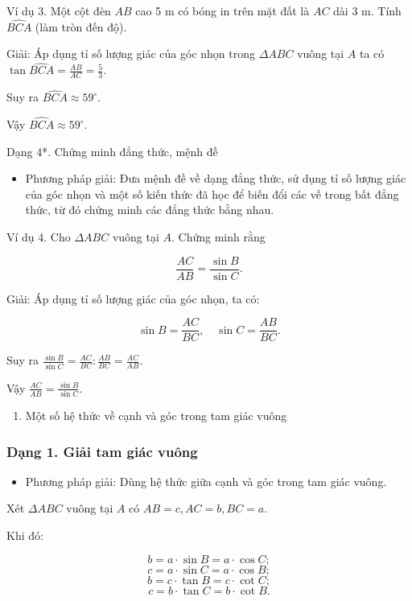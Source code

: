 \documentclass[%
    fontsize=12pt,%
    chapterprefix=false,%
    open=right,%
    twoside=false,%
    numbers=noenddot,%
    headings=optiontohead,%
    final,%
    DIV=15,%
    parskip=half %
]{scrbook}
\begin{document}

Ví dụ 3. Một cột đèn $ AB $ cao 5 m có bóng in trên mặt đất là $ AC $ dài 3 m. Tính $ \widehat{BCA} $ (làm tròn đến độ).

Giải: Áp dụng tỉ số lượng giác của góc nhọn trong $ \Delta ABC $ vuông tại $ A $ ta có $ \tan \widehat{BCA} = \frac{AB}{AC} = \frac{5}{3} $.

Suy ra $ \widehat{BCA} \approx 59^\circ $.

Vậy $ \widehat{BCA} \approx 59^\circ $.

Dạng 4*. Chứng minh đẳng thức, mệnh đề

\begin{itemize}
  \item Phương pháp giải: Đưa mệnh đề về dạng đẳng thức, sử dụng tỉ số lượng giác của góc nhọn và một số kiến thức đã học để biến đổi các vế trong bất đẳng thức, từ đó chứng minh các đẳng thức bằng nhau.
\end{itemize}

Ví dụ 4. Cho $ \Delta ABC $ vuông tại $ A $. Chứng minh rằng

\[
\frac{AC}{AB} = \frac{\sin B}{\sin C}.
\]

Giải: Áp dụng tỉ số lượng giác của góc nhọn, ta có:

\[
\sin B = \frac{AC}{BC}, \quad \sin C = \frac{AB}{BC}.
\]

Suy ra $ \frac{\sin B}{\sin C} = \frac{AC}{BC} : \frac{AB}{BC} = \frac{AC}{AB} $.

Vậy $ \frac{AC}{AB} = \frac{\sin B}{\sin C} $.

\begin{enumerate}
  \item Một số hệ thức về cạnh và góc trong tam giác vuông
\end{enumerate}
\subsubsection{Dạng 1. Giải tam giác vuông}

\begin{itemize}
  \item Phương pháp giải: Dùng hệ thức giữa cạnh và góc trong tam giác vuông.
\end{itemize}

Xét $ \Delta ABC $ vuông tại $ A $ có $ AB = c, AC = b, BC = a $.

Khi đó:

\[
b = a \cdot \sin B = a \cdot \cos C;
\]
\[
c = a \cdot \sin C = a \cdot \cos B;
\]
\[
b = c \cdot \tan B = c \cdot \cot C;
\]
\[
c = b \cdot \tan C = b \cdot \cot B.
\]
\end{document}
